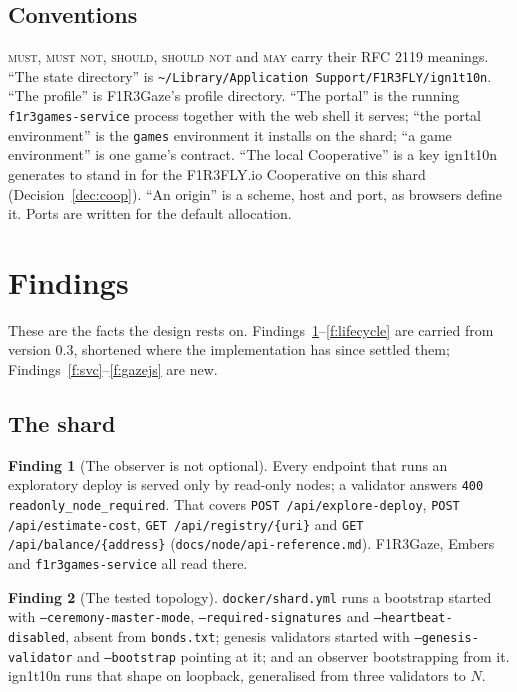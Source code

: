 \documentclass[11pt]{article}
\theoremstyle{definition}
\newtheorem{finding}{Finding}
\theoremstyle{remark}
\newcommand{\MUST}{\textsc{must}}
\newcommand{\MUSTNOT}{\textsc{must not}}
\newcommand{\SHOULD}{\textsc{should}}
\newcommand{\SHOULDNOT}{\textsc{should not}}
\newcommand{\MAY}{\textsc{may}}
\newcommand{\code}[1]{\texttt{#1}}
\newcommand{\Gz}{F1R3Gaze}
\newcommand{\Hr}{ign1t10n}
\newcommand{\Svc}{\code{f1r3games-service}}
\newcommand{\Em}{Embers}
\begin{document}
\subsection{Conventions}

\MUST, \MUSTNOT, \SHOULD, \SHOULDNOT{} and \MAY{} carry their RFC 2119 meanings.
``The state directory'' is \code{\textasciitilde/Library/Application Support/F1R3FLY/ign1t10n}.
``The profile'' is \Gz{}'s profile directory. ``The portal'' is the running \Svc{}
process together with the web shell it serves; ``the portal environment'' is the
\code{games} environment it installs on the shard; ``a game environment'' is one
game's contract. ``The local Cooperative'' is a key \Hr{} generates to stand in for
the F1R3FLY.io Cooperative on this shard (Decision~\ref{dec:coop}). ``An origin''
is a scheme, host and port, as browsers define it. Ports are written for the default
allocation.

\section{Findings}\label{sec:findings}

These are the facts the design rests on. Findings~\ref{f:readonly}--\ref{f:lifecycle}
are carried from version 0.3, shortened where the implementation has since settled
them; Findings~\ref{f:svc}--\ref{f:gazejs} are new.

\subsection{The shard}

\begin{finding}[The observer is not optional]\label{f:readonly}
Every endpoint that runs an exploratory deploy is served only by read-only nodes; a
validator answers \code{400 readonly\_node\_required}. That covers
\code{POST /api/explore-deploy}, \code{POST /api/estimate-cost},
\code{GET /api/registry/\{uri\}} and \code{GET /api/balance/\{address\}}
(\code{docs/node/api-reference.md}). \Gz{}, \Em{} and \Svc{} all read there.
\end{finding}

\begin{finding}[The tested topology]\label{f:topology}
\code{docker/shard.yml} runs a bootstrap started with \code{--ceremony-master-mode},
\code{--required-signatures} and \code{--heartbeat-disabled}, absent from
\code{bonds.txt}; genesis validators started with \code{--genesis-validator} and
\code{--bootstrap} pointing at it; and an observer bootstrapping from it. \Hr{} runs
that shape on loopback, generalised from three validators to $N$.
\end{finding}
\end{document}
